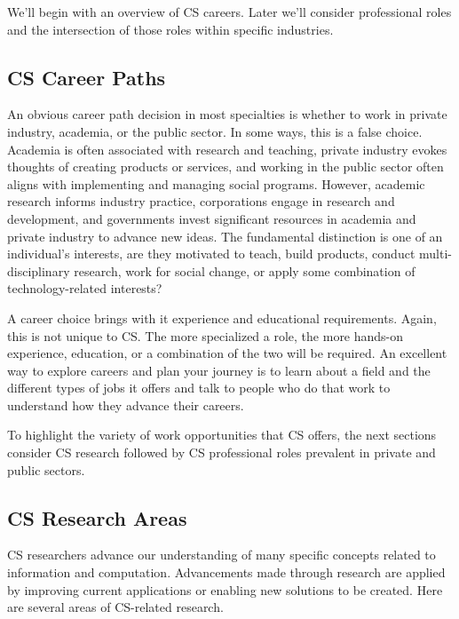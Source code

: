 We'll begin with an overview of CS careers. Later we'll consider professional roles and the intersection of those roles within specific industries.

\subsection{CS Career Paths}

An obvious career path decision in most specialties is whether to work in private industry, academia, or the public sector. In some ways, this is a false choice. Academia is often associated with research and teaching, private industry evokes thoughts of creating products or services, and working in the public sector often aligns with implementing and managing social programs. However, academic research informs industry practice, corporations engage in research and development, and governments invest significant resources in academia and private industry to advance new ideas. The fundamental distinction is one of an individual's interests, are they motivated to teach, build products, conduct multi-disciplinary research, work for social change, or apply some combination of technology-related interests?

A career choice brings with it experience and educational requirements. Again, this is not unique to CS. The more specialized a role, the more hands-on experience, education, or a combination of the two will be required. An excellent way to explore careers and plan your journey is to learn about a field and the different types of jobs it offers and talk to people who do that work to understand how they advance their careers. 

To highlight the variety of work opportunities that CS offers, the next sections consider CS research followed by CS professional roles prevalent in private and public sectors. 

\subsection{CS Research Areas}

CS researchers advance our understanding of many specific concepts related to information and computation. Advancements made through research are applied by improving current applications or enabling new solutions to be created. Here are several areas of CS-related research.

